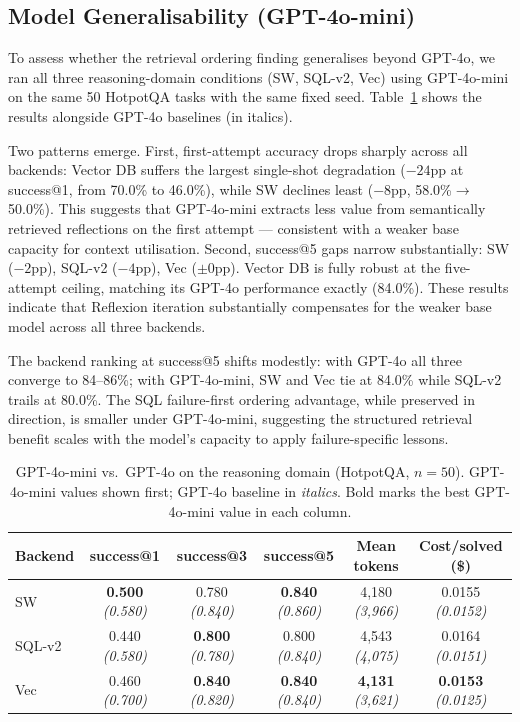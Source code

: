 \documentclass{article}
\begin{document}
\subsection{Model Generalisability (GPT-4o-mini)}
\label{sec:miniresults}

To assess whether the retrieval ordering finding generalises beyond GPT-4o,
we ran all three reasoning-domain conditions (SW, SQL-v2, Vec) using
GPT-4o-mini on the same 50 HotpotQA tasks with the same fixed seed.
Table~\ref{tab:mini} shows the results alongside GPT-4o baselines (in italics).

Two patterns emerge. First, first-attempt accuracy drops sharply across all
backends: Vector DB suffers the largest single-shot degradation ($-24$pp at
success@1, from 70.0\% to 46.0\%), while SW declines least ($-8$pp,
58.0\%$\to$50.0\%). This suggests that GPT-4o-mini extracts less value
from semantically retrieved reflections on the first attempt --- consistent
with a weaker base capacity for context utilisation. Second, success@5 gaps
narrow substantially: SW ($-2$pp), SQL-v2 ($-4$pp), Vec ($\pm 0$pp).
Vector DB is fully robust at the five-attempt ceiling, matching its GPT-4o
performance exactly (84.0\%). These results indicate that Reflexion iteration
substantially compensates for the weaker base model across all three backends.

The backend ranking at success@5 shifts modestly: with GPT-4o all three
converge to 84--86\%; with GPT-4o-mini, SW and Vec tie at 84.0\% while
SQL-v2 trails at 80.0\%. The SQL failure-first ordering advantage, while
preserved in direction, is smaller under GPT-4o-mini, suggesting the
structured retrieval benefit scales with the model's capacity to apply
failure-specific lessons.

\begin{table}[h]
\centering
\caption{
  GPT-4o-mini vs.\ GPT-4o on the reasoning domain (HotpotQA, $n{=}50$).
  GPT-4o-mini values shown first; GPT-4o baseline in \textit{italics}.
  Bold marks the best GPT-4o-mini value in each column.
}
\label{tab:mini}
\small
\begin{tabular}{lccccc}
\toprule
Backend & success@1 & success@3 & success@5 & Mean tokens & Cost/solved (\$) \\
\midrule
SW
  & \textbf{0.500} \textit{(0.580)}
  & 0.780 \textit{(0.840)}
  & \textbf{0.840} \textit{(0.860)}
  & 4{,}180 \textit{(3{,}966)}
  & 0.0155 \textit{(0.0152)} \\
SQL-v2
  & 0.440 \textit{(0.580)}
  & \textbf{0.800} \textit{(0.780)}
  & 0.800 \textit{(0.840)}
  & 4{,}543 \textit{(4{,}075)}
  & 0.0164 \textit{(0.0151)} \\
Vec
  & 0.460 \textit{(0.700)}
  & \textbf{0.840} \textit{(0.820)}
  & \textbf{0.840} \textit{(0.840)}
  & \textbf{4{,}131} \textit{(3{,}621)}
  & \textbf{0.0153} \textit{(0.0125)} \\
\bottomrule
\end{tabular}
\end{table}
\end{document}
